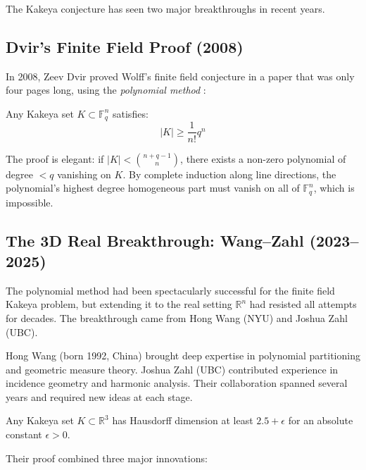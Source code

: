 The Kakeya conjecture has seen two major breakthroughs in recent years.

\subsection{Dvir's Finite Field Proof (2008)}
In 2008, Zeev Dvir proved Wolff's finite field conjecture in a paper that was only four pages long, using the \emph{polynomial method} \cite{dvir2009}:

\begin{theorem}
Any Kakeya set $K \subset \mathbb{F}_q^n$ satisfies:
\begin{equation}
|K| \geq \frac{1}{n!} q^n
\end{equation}
\end{theorem}

The proof is elegant: if $|K| < \binom{n+q-1}{n}$, there exists a non-zero polynomial of degree $<q$ vanishing on $K$. By complete induction along line directions, the polynomial's highest degree homogeneous part must vanish on all of $\mathbb{F}_q^n$, which is impossible.

\subsection{The 3D Real Breakthrough: Wang--Zahl (2023--2025)}

The polynomial method had been spectacularly successful for the finite field Kakeya problem, but extending it to the real setting $\mathbb{R}^n$ had resisted all attempts for decades. The breakthrough came from Hong Wang (NYU) and Joshua Zahl (UBC).

\begin{historicalbox}
Hong Wang (born 1992, China) brought deep expertise in polynomial partitioning and geometric measure theory. Joshua Zahl (UBC) contributed experience in incidence geometry and harmonic analysis. Their collaboration spanned several years and required new ideas at each stage.
\end{historicalbox}

\begin{theorem}
Any Kakeya set $K \subset \mathbb{R}^3$ has Hausdorff dimension at least $2.5 + \epsilon$ for an absolute constant $\epsilon > 0$.
\end{theorem}

Their proof combined three major innovations:

